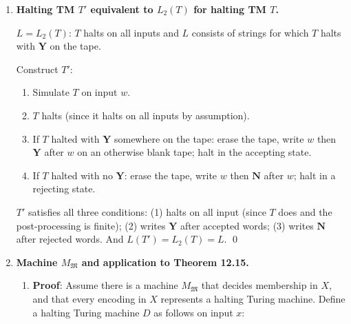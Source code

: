 \begin{enumerate}[{12.}1. ]
\begin{enumerate}
\item \textbf{Concatenation}: $M$ for $L_1\cdot L_2$ on input $x$: enumerate all splits $x=uv$, run $M_1$ on $u$ and $M_2$ on $v$. Since both halt, each check halts. There are $|x|+1$ splits (finitely many), all decidable. Accept if any split works. \qed

\item \textbf{Reversal}: $M$ for $L_1^r$ on input $x$: compute $x^r$ (finitely computable), run $M_1$ on $x^r$. $M_1$ halts on $x^r$; so $M$ halts. Accept iff $M_1$ accepts $x^r$. \qed
\end{enumerate}

\item \textbf{Halting TM $T'$ equivalent to $L_2(T)$ for halting TM $T$.}

$L = L_2(T)$: $T$ halts on all inputs and $L$ consists of strings for which $T$ halts with $\pmb{Y}$ on the tape.

Construct $T'$:
\begin{enumerate}[1.]
\item Simulate $T$ on input $w$.
\item $T$ halts (since it halts on all inputs by assumption).
\item If $T$ halted with $\pmb{Y}$ somewhere on the tape: erase the tape, write $w$ then $\pmb{Y}$ after $w$ on an otherwise blank tape; halt in the accepting state.
\item If $T$ halted with no $\pmb{Y}$: erase the tape, write $w$ then $\pmb{N}$ after $w$; halt in a rejecting state.
\end{enumerate}

$T'$ satisfies all three conditions: (1) halts on all input (since $T$ does and the post-processing is finite); (2) writes $\pmb{Y}$ after accepted words; (3) writes $\pmb{N}$ after rejected words. And $L(T') = L_2(T) = L$. \qed

\item \textbf{Machine $M_{\mathfrak{M}}$ and application to Theorem 12.15.}

\begin{enumerate}
\item \textbf{Proof}: Assume there is a machine $M_{\mathfrak M}$ that decides
membership in $X$, and that every encoding in $X$ represents a halting Turing
machine. Define a halting Turing machine $D$ as follows on input $x$:


\end{enumerate}
\end{enumerate}
